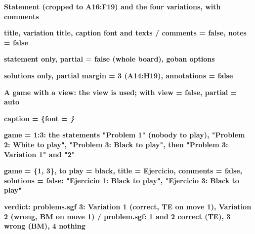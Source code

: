 \documentclass{article}
\newcommand\case[1]{\par\medskip\noindent\textbf{#1}\par\nopagebreak}
\begin{document}

\case{Statement (cropped to A16:F19) and the four variations, with comments}

\case{title, variation title, caption font and texts / comments = false, notes = false}

\case{statement only, partial = false (whole board), goban options}

\case{solutions only, partial margin = 3 (A14:H19), annotations = false}

\case{A game with a view: the view is used; with view = false, partial = auto}

\case{caption = \{font = \string\itshape\}}


\case{game = 1:3: the statements "Problem 1" (nobody to play), "Problem 2: White to play", "Problem 3: Black to play", then "Problem 3: Variation 1" and "2"}

\case{game = \{1, 3\}, to play = black, title = Ejercicio, comments = false, solutions = false: "Ejercicio 1: Black to play", "Ejercicio 3: Black to play"}

\case{verdict: problems.sgf 3: Variation 1 (correct, TE on move 1), Variation 2 (wrong, BM on move 1) / problem.sgf: 1 and 2 correct (TE), 3 wrong (BM), 4 nothing}
\end{document}
